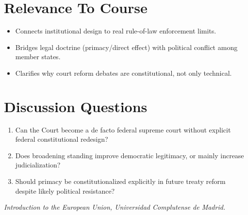 \documentclass[11pt,a4paper]{article}
\begin{document}
\section*{Relevance To Course}
\begin{itemize}
\item Connects institutional design to real rule-of-law enforcement limits.
\item Bridges legal doctrine (primacy/direct effect) with political conflict among member states.
\item Clarifies why court reform debates are constitutional, not only technical.
\end{itemize}

\section*{Discussion Questions}
\begin{enumerate}
\item Can the Court become a de facto federal supreme court without explicit federal constitutional redesign?
\item Does broadening standing improve democratic legitimacy, or mainly increase judicialization?
\item Should primacy be constitutionalized explicitly in future treaty reform despite likely political resistance?
\end{enumerate}

\vspace{1em}
\noindent\footnotesize\textit{Introduction to the European Union, Universidad Complutense de Madrid.}
\end{document}
